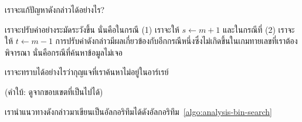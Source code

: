 \begin{quiz}{}
เรา{\wbr}จะ{\wbr}แก้{\wbr}ปัญหา{\wbr}ดังกล่าว{\wbr}ได้{\wbr}อย่างไร?
\end{quiz}

เรา{\wbr}จะ{\wbr}ปรับ{\wbr}ค่า{\wbr}อย่าง{\wbr}ระมัดระวัง{\wbr}ขึ้น นั่น{\wbr}คือ{\wbr}ใน{\wbr}กรณี (1) เรา{\wbr}จะ{\wbr}ให้ $s\leftarrow m+1$
และ{\wbr}ใน{\wbr}กรณี{\wbr}ที่ (2) เรา{\wbr}จะ{\wbr}ให้ $t\leftarrow m-1$
การ{\wbr}ปรับ{\wbr}ค่า{\wbr}ดังกล่าว{\wbr}มี{\wbr}ผล{\wbr}เกี่ยวข้อง{\wbr}กับ{\wbr}อีก{\wbr}กรณี{\wbr}หนึ่ง{\wbr}ซึ่ง{\wbr}ไม่{\wbr}เกิด{\wbr}ขึ้น{\wbr}ใน{\wbr}เกม{\wbr}ทาย{\wbr}เลขที่{\wbr}เรา{\wbr}ต้อง{\wbr}พิจารณา{\wbr}
นั่น{\wbr}คือ{\wbr}กรณี{\wbr}ที่{\wbr}ค้นหา{\wbr}ข้อมูล{\wbr}ไม่{\wbr}เจอ{\wbr}

\begin{quiz}{}
เรา{\wbr}จะ{\wbr}ทราบ{\wbr}ได้{\wbr}อย่างไร{\wbr}ว่า{\wbr}กุญแจ{\wbr}ที่{\wbr}เรา{\wbr}ค้นหา{\wbr}ไม่{\wbr}อยู่{\wbr}ใน{\wbr}อาร์เรย์

(คำ{\wbr}ใบ้: ดู{\wbr}จาก{\wbr}ขอบเขต{\wbr}ที่{\wbr}เป็น{\wbr}ไป{\wbr}ได้)
\end{quiz}

เรา{\wbr}นำ{\wbr}แนวทาง{\wbr}ดังกล่าว{\wbr}มา{\wbr}เขียน{\wbr}เป็น{\wbr}อัล{\wbr}กอ{\wbr}ริ{\wbr}ทึม{\wbr}ได้{\wbr}ดัง{\wbr}อัล{\wbr}กอ{\wbr}ริ{\wbr}ทึม~\ref{algo:analysis-bin-search}

